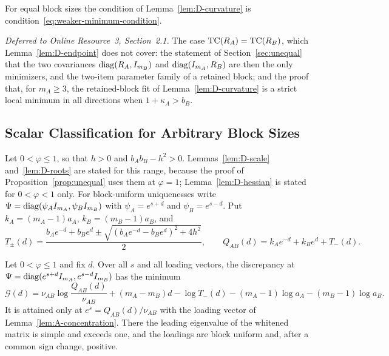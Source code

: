 For equal block sizes the condition of Lemma~\ref{lem:D-curvature} is condition~\eqref{eq:weaker-minimum-condition}.

\textit{Deferred to Online Resource~3, Section~2.1.} The case $\operatorname{TC}(R_A)=\operatorname{TC}(R_B)$, which Lemma~\ref{lem:D-endpoint} does not cover: the statement of Section~\ref{sec:unequal} that the two covariances $\operatorname{diag}(R_A,I_{m_B})$ and $\operatorname{diag}(I_{m_A},R_B)$ are then the only minimizers, and the two-item parameter family of a retained block; and the proof that, for $m_A\ge3$, the retained-block fit of Lemma~\ref{lem:D-curvature} is a strict local minimum in all directions when $1+\kappa_A>b_B$.

\subsection{Scalar Classification for Arbitrary Block Sizes}
\label{app:unequal-scalar}

Let $0<\varphi\le1$, so that $h>0$ and $b_Ab_B-h^2>0$. Lemmas~\ref{lem:D-scale} and~\ref{lem:D-roots} are stated for this range, because the proof of Proposition~\ref{prop:unequal} uses them at $\varphi=1$; Lemma~\ref{lem:D-hessian} is stated for $0<\varphi<1$ only. For block-uniform uniquenesses write $\Psi=\operatorname{diag}(\psi_AI_{m_A},\psi_BI_{m_B})$ with $\psi_A=e^{s+d}$ and $\psi_B=e^{s-d}$. Put $k_A=(m_A-1)a_A$, $k_B=(m_B-1)a_B$, and
\[
T_\pm(d)=\frac{b_Ae^{-d}+b_Be^{d}\pm\sqrt{(b_Ae^{-d}-b_Be^{d})^2+4h^2}}2,
\qquad
Q_{AB}(d)=k_Ae^{-d}+k_Be^{d}+T_-(d).
\]

\begin{applemma}
\label{lem:D-scale}
Let $0<\varphi\le1$ and fix $d$. Over all $s$ and all loading vectors, the discrepancy at $\Psi=\operatorname{diag}(e^{s+d}I_{m_A},e^{s-d}I_{m_B})$ has the minimum
\[
\mathcal G(d)=\nu_{AB}\log\frac{Q_{AB}(d)}{\nu_{AB}}+(m_A-m_B)d-\log T_-(d)
-(m_A-1)\log a_A-(m_B-1)\log a_B .
\]
It is attained only at $e^s=Q_{AB}(d)/\nu_{AB}$ with the loading vector of Lemma~\ref{lem:A-concentration}. There the leading eigenvalue of the whitened matrix is simple and exceeds one, and the loadings are block uniform and, after a common sign change, positive.
\end{applemma}

